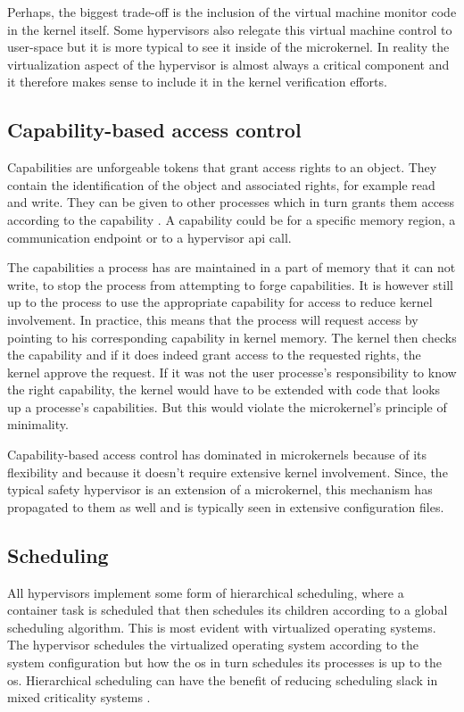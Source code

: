 Perhaps, the biggest trade-off is the inclusion of the virtual machine monitor code in the kernel itself. Some hypervisors also relegate this virtual machine control to user-space but it is more typical to see it inside of the microkernel. In reality the virtualization aspect of the hypervisor is almost always a critical component and it therefore makes sense to include it in the kernel verification efforts. 

\subsection{Capability-based access control} \label{sec:capability-based_ac}
Capabilities are unforgeable tokens that grant access rights to an object. They contain the identification of the object and associated rights, for example read and write.
They can be given to other processes which in turn grants them access according to the capability \cite{levy1984capability}. A capability could be for a specific memory region, a communication endpoint or to a hypervisor \acrshort{api} call.

The capabilities a process has are maintained in a part of memory that it can not write, to stop the process from attempting to forge capabilities. It is however still up to the process to use the appropriate capability for access to reduce kernel involvement. In practice, this means that the process will request access by pointing to his corresponding capability in kernel memory. The kernel then checks the capability and if it does indeed grant access to the requested rights, the kernel approve the request. If it was not the user processe's responsibility to know the right capability, the kernel would have to be extended with code that looks up a processe's capabilities. But this would violate the microkernel's principle of minimality.

Capability-based access control has dominated in microkernels because of its flexibility and because it doesn't require extensive kernel involvement. Since, the typical safety hypervisor is an extension of a microkernel, this mechanism has propagated to them as well and is typically seen in extensive configuration files.

\subsection{Scheduling} \label{hv-scheduling}
All hypervisors implement some form of hierarchical scheduling, where a container task is scheduled that then schedules its children according to a global scheduling algorithm. This is most evident with virtualized operating systems. The hypervisor schedules the virtualized operating system according to the system configuration but how the \acrshort{os} in turn schedules its processes is up to the \acrshort{os}. Hierarchical scheduling can have the benefit of reducing scheduling slack in mixed criticality systems \cite{mollison2010mixed}. 

